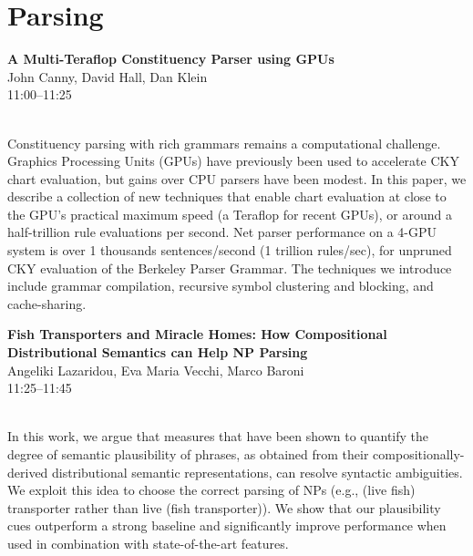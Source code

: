 \documentclass[twoside,makeidx]{book}
\begin{document}
\section{Parsing}
\vspace{-1em}
\par\vspace{2em}\noindent%
\begin{minipage}{\linewidth}%
\begin{center}
\textbf{\normalsize A Multi-Teraflop Constituency Parser using GPUs}\\
\normalsize  John Canny,  David Hall,  Dan Klein\\
{\small 11:00--11:25}\\
\end{center}
\end{minipage}\\[0.5em]
\nopagebreak%
\noindent%
{\small Constituency parsing with rich grammars remains a computational challenge.  Graphics Processing Units (GPUs) have previously been used to accelerate CKY chart evaluation, but gains over CPU parsers have been modest. In this paper, we describe a collection of new techniques that enable chart evaluation at close to the GPU's practical maximum speed (a Teraflop for recent GPUs), or around a half-trillion rule evaluations per second. Net parser performance on a 4-GPU system is over 1 thousands sentences/second (1 trillion rules/sec), for unpruned CKY evaluation of the Berkeley Parser Grammar.                                               The techniques we introduce include grammar compilation, recursive symbol clustering and blocking, and cache-sharing.}
\par\vspace{2em}\noindent%
\begin{minipage}{\linewidth}%
\begin{center}
\textbf{\normalsize Fish Transporters and Miracle Homes: How Compositional Distributional Semantics can Help NP Parsing}\\
\normalsize  Angeliki Lazaridou,  Eva Maria Vecchi,  Marco Baroni\\
{\small 11:25--11:45}\\
\end{center}
\end{minipage}\\[0.5em]
\nopagebreak%
\noindent%
{\small In this work, we argue that measures that have been shown to quantify the degree of semantic plausibility of phrases, as obtained from their compositionally-derived distributional semantic representations,  can resolve syntactic ambiguities.  We exploit this idea to choose the correct parsing of NPs (e.g., (live fish) transporter  rather than live (fish transporter)).  We show that our plausibility cues outperform a strong baseline and significantly improve performance when used in combination with state-of-the-art features.}
\clearpage
\end{document}

